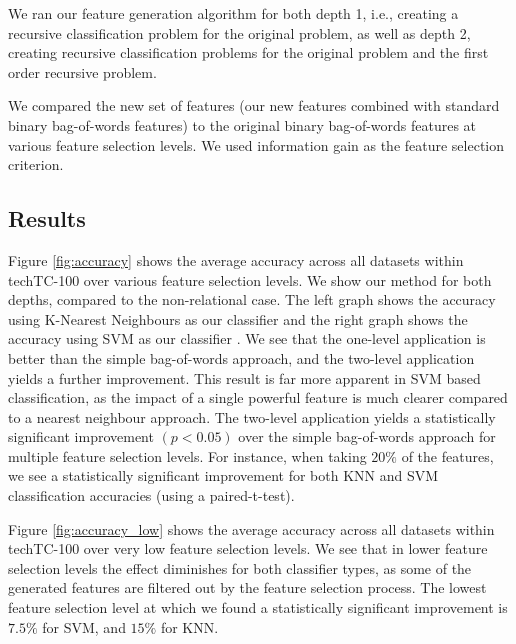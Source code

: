 \documentclass{article}
\theoremstyle{definition}
\begin{document}
We ran our feature generation algorithm for both depth 1, i.e., creating a recursive classification problem for the original problem, as well as depth 2, creating recursive classification problems for the original problem and the first order recursive problem.

We compared the new set of features (our new features combined with standard binary bag-of-words features) to the original binary bag-of-words features at various feature selection levels. We used information gain as the feature selection criterion.
\subsection{Results}
Figure \ref{fig:accuracy} shows the average accuracy across all datasets within techTC-100 over various feature selection levels. We show our method for both depths, compared to the non-relational case.  The left graph shows the accuracy using K-Nearest Neighbours \citep{fix1951discriminatory} as our classifier and the right graph shows the accuracy using SVM \citep{cortes1995support} as our classifier . %
We see that the one-level application is better than the simple bag-of-words approach, and the two-level application yields a further improvement. This result is far more apparent in SVM based classification, as the impact of a single powerful feature is much clearer compared to a nearest neighbour approach. The two-level application yields a statistically significant improvement $ (p<0.05) $ over the simple bag-of-words approach for multiple feature selection levels. For instance, when taking $20\% $ of the features, we see a statistically significant improvement for both KNN and SVM classification accuracies (using a paired-t-test). 

Figure \ref{fig:accuracy_low} shows the average accuracy across all datasets within techTC-100 over very low feature selection levels. 
We see that in lower feature selection levels the effect diminishes for both classifier types, as some of the generated features are filtered out by the feature selection process. The lowest feature selection level at which we found a statistically significant improvement is $7.5\%$ for SVM, and $15\%$ for KNN.
\end{document}
